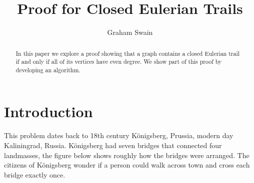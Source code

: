 \documentclass[10pt]{amsart}
\begin{document}
\parskip10pt
\parindent12pt
\baselineskip16pt






\def\G{\widetilde{G}}
\def\B{\widetilde{B}}
\def\T{\widetilde{T}}
\def\C{\mathbb{C}}
\def\A{\mathbb{A}}
\def\Z{\mathbb{Z}}
\def\R{\mathbb{R}}
\def\Q{\mathbb{Q}}
\def\N{\mathbb{N}}
\def\C{\mathbb{C}}
\def\F{\mathbb{F}}
\def\I{\mathbb{I}}
\def\H{\mathcal{H}}
\def\e{\varepsilon}
\def\s{\underline s}
\def\z{\zeta }
\def\vp{\varpi }
\def\O{\mathcal O}
\def\v{\upsilon }
\def\U{\Upsilon }
\def\p{\wp }
\def\p{\mathfrak{p}}
\def\B{\mathfrak{B}}

\newtheorem{theorem}{Theorem}%
\newtheorem{lemma}[theorem]{Lemma}


\title{Proof for Closed Eulerian Trails}

\author{Graham Swain}




\begin{abstract}
In this paper we explore a proof showing that a graph contains a closed Eulerian trail if and only if
all of its vertices have even degree. We show part of this proof by developing an algorithm.
\end{abstract}

\maketitle





\section{Introduction}

This problem dates back to 18th century K\"{o}nigsberg, Prussia, modern day Kaliningrad, Russia. 
K\"{o}nigsberg had seven bridges that connected four landmasses, the figure below shows roughly 
how the bridges were arranged. The citizens of K\"{o}nigsberg wonder if a person could walk across 
town and cross each bridge exactly once.
\end{document}

